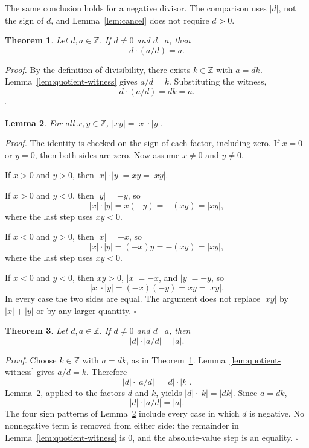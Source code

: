 \documentclass[11pt,letterpaper]{article}
\newcommand{\Z}{\mathbb{Z}}
\newtheorem{theorem}{Theorem}
\newtheorem{lemma}[theorem]{Lemma}
\newenvironment{proof}{\noindent\textit{Proof.}}{\hfill\(\square\)}
\begin{document}
The same conclusion holds for a negative divisor. The comparison uses
\(|d|\), not the sign of \(d\), and Lemma~\ref{lem:cancel} does not require
\(d>0\).

\begin{theorem}
\label{thm:return-product}
Let \(d,a\in\Z\). If \(d\neq 0\) and \(d\mid a\), then
\[
d\cdot(a/d)=a.
\]
\end{theorem}

\begin{proof}
By the definition of divisibility, there exists \(k\in\Z\) with \(a=dk\).
Lemma~\ref{lem:quotient-witness} gives \(a/d=k\). Substituting the witness,
\[
d\cdot(a/d)=dk=a.
\]
\end{proof}

\begin{lemma}
\label{lem:abs-mul}
For all \(x,y\in\Z\), \(|xy|=|x|\cdot|y|\).
\end{lemma}

\begin{proof}
The identity is checked on the sign of each factor, including zero. If \(x=0\)
or \(y=0\), then both sides are zero. Now assume \(x\neq 0\) and \(y\neq 0\).

If \(x>0\) and \(y>0\), then \(|x|\cdot|y|=xy=|xy|\).

If \(x>0\) and \(y<0\), then \(|y|=-y\), so
\[
|x|\cdot|y|=x(-y)=-(xy)=|xy|,
\]
where the last step uses \(xy<0\).

If \(x<0\) and \(y>0\), then \(|x|=-x\), so
\[
|x|\cdot|y|=(-x)y=-(xy)=|xy|,
\]
where the last step uses \(xy<0\).

If \(x<0\) and \(y<0\), then \(xy>0\), \(|x|=-x\), and \(|y|=-y\), so
\[
|x|\cdot|y|=(-x)(-y)=xy=|xy|.
\]
In every case the two sides are equal. The argument does not replace \(|xy|\)
by \(|x|+|y|\) or by any larger quantity.
\end{proof}

\begin{theorem}
\label{thm:return-abs-product}
Let \(d,a\in\Z\). If \(d\neq 0\) and \(d\mid a\), then
\[
|d|\cdot|a/d|=|a|.
\]
\end{theorem}

\begin{proof}
Choose \(k\in\Z\) with \(a=dk\), as in Theorem~\ref{thm:return-product}.
Lemma~\ref{lem:quotient-witness} gives \(a/d=k\). Therefore
\[
|d|\cdot|a/d|=|d|\cdot|k|.
\]
Lemma~\ref{lem:abs-mul}, applied to the factors \(d\) and \(k\), yields
\(|d|\cdot|k|=|dk|\). Since \(a=dk\),
\[
|d|\cdot|a/d|=|a|.
\]
The four sign patterns of Lemma~\ref{lem:abs-mul} include every case in which
\(d\) is negative. No nonnegative term is removed from either side: the
remainder in Lemma~\ref{lem:quotient-witness} is \(0\), and the absolute-value
step is an equality.
\end{proof}
\end{document}
